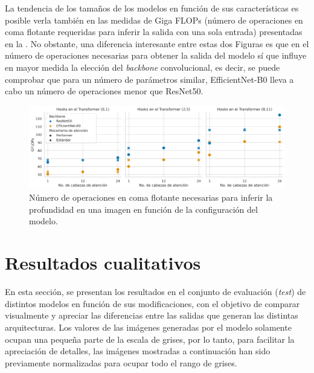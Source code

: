 La tendencia de los tamaños de los modelos en función de sus características es posible verla también en las medidas de Giga FLOPs (número de operaciones en coma flotante requeridas para inferir la salida con una sola entrada) presentadas en la . No obstante, una diferencia interesante entre estas dos Figuras es que en el número de operaciones necesarias para obtener la salida del modelo sí que influye en mayor medida la elección del \textit{backbone} convolucional, es decir, se puede comprobar que para un número de parámetros similar, EfficientNet-B0 lleva a cabo un número de operaciones menor que ResNet50.

\begin{figure}[H]
\centering
\includegraphics[width=\linewidth]{imagenes/Resultados/gflops.png} 
\captionsetup{width=.95\linewidth}
\caption{Número de operaciones en coma flotante necesarias para inferir la profundidad en una imagen en función de la configuración del modelo.}
\label{fig:resultados-gflops}
\end{figure}













\pagebreak

\section{Resultados cualitativos}

En esta sección, se presentan los resultados en el conjunto de evaluación (\textit{test}) de distintos modelos en función de sus modificaciones, con el objetivo de comparar visualmente y apreciar las diferencias entre las salidas que generan las distintas arquitecturas. Los valores de las imágenes generadas por el modelo solamente ocupan una pequeña parte de la escala de grises, por lo tanto, para facilitar la apreciación de detalles, las imágenes mostradas a continuación han sido previamente normalizadas para ocupar todo el rango de grises. 

